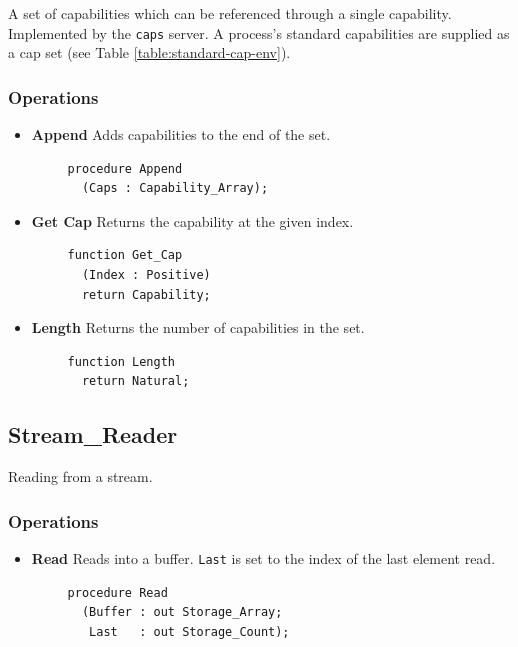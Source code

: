A set of capabilities which can be referenced through a single capability.  Implemented by the {\tt caps} server.  A process's standard capabilities are supplied as a cap set (see Table \ref{table:standard-cap-env}).

\subsubsection{Operations}

\begin{itemize}
    \item \textbf{Append} Adds capabilities to the end of the set.

    \begin{verbatim}
     procedure Append
       (Caps : Capability_Array);
    \end{verbatim}

    \item \textbf{Get Cap} Returns the capability at the given index.

    \begin{verbatim}
     function Get_Cap
       (Index : Positive)
       return Capability;
    \end{verbatim}

    \item \textbf{Length} Returns the number of capabilities in the set.

    \begin{verbatim}
     function Length
       return Natural;
    \end{verbatim}
\end{itemize}

\subsection{Stream\_Reader}

Reading from a stream.

\subsubsection{Operations}

\begin{itemize}
    \item \textbf{Read} Reads into a buffer.  {\tt Last} is set to the index of the last element read.

    \begin{verbatim}
     procedure Read
       (Buffer : out Storage_Array;
        Last   : out Storage_Count);
    \end{verbatim}
\end{itemize}

